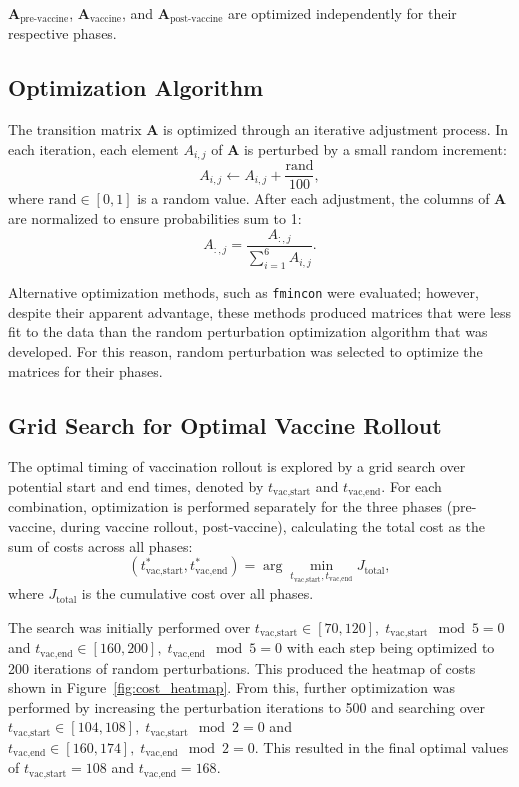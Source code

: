 \documentclass[conference]{IEEEtran}
\begin{document}
$\mathbf{A}_{\text{pre-vaccine}}$, $\mathbf{A}_{\text{vaccine}}$, and $\mathbf{A}_{\text{post-vaccine}}$ are optimized independently for their respective phases.

\subsection{Optimization Algorithm}
The transition matrix $\mathbf{A}$ is optimized through an iterative adjustment process. In each iteration, each element $A_{i,j}$ of $\mathbf{A}$ is perturbed by a small random increment:
\begin{equation}
    A_{i,j} \leftarrow A_{i,j} + \frac{\text{rand}}{100},
\end{equation}
where $\text{rand} \in [0, 1]$ is a random value. After each adjustment, the columns of $\mathbf{A}$ are normalized to ensure probabilities sum to 1:
\begin{equation}
    A_{:,j} = \frac{A_{:,j}}{\sum_{i=1}^6 A_{i,j}}.
\end{equation}

Alternative optimization methods, such as \texttt{fmincon} were evaluated; however, despite their apparent advantage, these methods produced matrices that were less fit to the data than the random perturbation optimization algorithm that was developed. For this reason, random perturbation was selected to optimize the matrices for their phases.

\subsection{Grid Search for Optimal Vaccine Rollout}
The optimal timing of vaccination rollout is explored by a grid search over potential start and end times, denoted by $t_{\text{vac,start}}$ and $t_{\text{vac,end}}$. For each combination, optimization is performed separately for the three phases (pre-vaccine, during vaccine rollout, post-vaccine), calculating the total cost as the sum of costs across all phases:
\begin{equation}
    (t_{\text{vac,start}}^*, t_{\text{vac,end}}^*) = \arg\min_{t_{\text{vac,start}}, t_{\text{vac,end}}} J_{\text{total}},
\end{equation}
where $J_{\text{total}}$ is the cumulative cost over all phases.

The search was initially performed over $t_{\text{vac,start}} \in [70, 120], \; t_{\text{vac,start}} \mod 5 = 0$ and $t_{\text{vac,end}} \in [160, 200], \; t_{\text{vac,end}} \mod 5 = 0$ with each step being optimized to 200 iterations of random perturbations. This produced the heatmap of costs shown in Figure~\ref{fig:cost_heatmap}. From this, further optimization was performed by increasing the perturbation iterations to 500 and searching over $t_{\text{vac,start}} \in [104, 108], \; t_{\text{vac,start}} \mod 2 = 0$ and $t_{\text{vac,end}} \in [160, 174], \; t_{\text{vac,end}} \mod 2 = 0$. This resulted in the final optimal values of $t_{\text{vac,start}} = 108$ and $t_{\text{vac,end}} = 168$.
\end{document}
